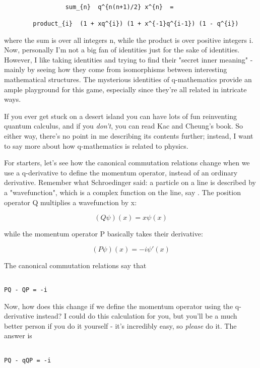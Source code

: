 \begin{verbatim}

                 sum_{n}  q^{n(n+1)/2} x^{n}  =  

        product_{i}  (1 + xq^{i}) (1 + x^{-1}q^{i-1}) (1 - q^{i}) 
\end{verbatim}
    
where the sum is over all integers n, while the product is over positive
integers i.  Now, personally I'm not a big fan of identities just for
the sake of identities.  However, I like taking identities and trying to 
find their "secret inner meaning" - mainly by seeing how they come 
from isomorphisms between interesting mathematical structures.  The 
mysterious identities of q-mathematics provide an ample playground 
for this game, especially since they're all related in intricate ways.  

If you ever get stuck on a desert island you can have lots of fun
reinventing quantum calculus, and if you \emph{don't}, you can read Kac 
and Cheung's book.  So either way, there's no point in me describing 
its contents further; instead, I want to say more about how q-mathematics
is related to physics.

For starters, let's see how the canonical commutation relations
change when we use a q-derivative to define the momentum operator,
instead of an ordinary derivative.  Remember what Schroedinger said:
a particle on a line is described by a "wavefunction", which is a 
complex function on the line, say \psi .  The position operator Q 
multiplies a wavefunction by x:


$$

(Q \psi )(x) = x \psi (x)
$$
    
while the momentum operator P basically takes their derivative:


$$

(P \psi )(x) = -i \psi '(x)
$$
    
The canonical commutation relations say that


\begin{verbatim}

PQ - QP = -i
\end{verbatim}
    
Now, how does this change if we define the momentum operator using the
q-derivative instead?  I could do this calculation for you, but you'll
be a much better person if you do it yourself - it's incredibly easy, 
so \emph{please} do it.  The answer is


\begin{verbatim}

PQ - qQP = -i
\end{verbatim}
    

